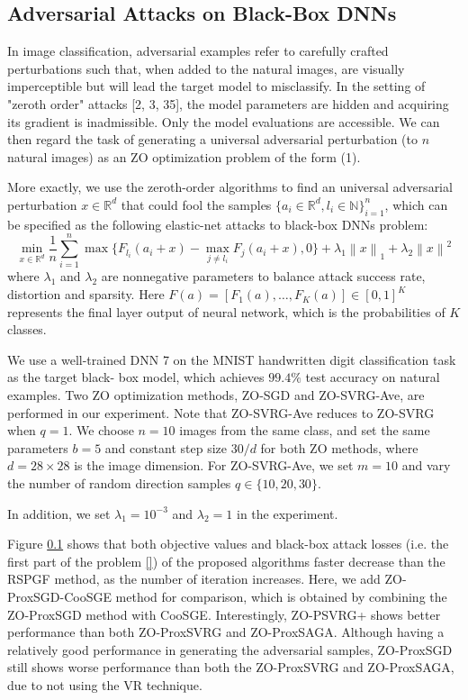 \documentclass{article}
\newcommand*{\R}{\mathbb{R}}
\newcommand{\norm}[1]{\left\lVert#1\right\rVert}
\theoremstyle{definition}
\theoremstyle{remark}
\begin{document}
\subsection{Adversarial Attacks on Black-Box DNNs}

{\color{Brown}
In image classification, adversarial
examples refer to carefully crafted perturbations such that, when added to the natural images, are
visually imperceptible but will lead the target model to misclassify. In the setting of "zeroth order"
attacks [2, 3, 35], the model parameters are hidden and acquiring its gradient is inadmissible. Only
the model evaluations are accessible. We can then regard the task of generating a universal adversarial
perturbation (to $n$ natural images) as an ZO optimization problem of the form (1).
{\color{Green}
More exactly,
we use the zeroth-order algorithms to find an universal adversarial perturbation $x\in\R^d$ that could fool the samples $\{a_i \in \R^d, l_i\in\mathbb{N} \}_{i=1}^n$, which can be specified as the following elastic-net attacks to black-box DNNs problem:
\begin{equation}
\min_{x\in\R^d} \frac{1}{n} \sum_{i=1}^n \max\{F_{l_i}(a_i+x) - \max_{j\neq l_i}F_j(a_i+x),0\} + \lambda_1 \norm{x}_{1} + \lambda_2 \norm{x}^{2}
\end{equation}
where $\lambda_1$ and $\lambda_2$ are nonnegative parameters to balance attack success rate, distortion and sparsity. Here $F(a) = \left[F_1(a),\ldots,F_K(a)\right]\in [0, 1]^K$ represents the final layer output of neural network, which is the probabilities of $K$ classes.

}

We use a well-trained DNN 7 on the MNIST handwritten digit classification task as the target black-
box model, which achieves $99.4\%$ test accuracy on natural examples. Two ZO optimization methods,
ZO-SGD and ZO-SVRG-Ave, are performed in our experiment. Note that ZO-SVRG-Ave reduces
to ZO-SVRG when $q = 1$. We choose $n = 10$ images from the same class, and set the same
parameters $b = 5$ and constant step size $30/d$ for both ZO methods, where $d = 28 \times 28$ is the image
dimension. For ZO-SVRG-Ave, we set $m = 10$ and vary the number of random direction samples
$q \in \{10, 20, 30\}$.


{\color{Green}
In addition, we set $\lambda_1 = 10^{-3}$ and $\lambda_2 = 1$ in the experiment.
}
}


{\color{Green}

Figure \ref{} shows that both objective values and black-box attack losses (i.e. the first part of the problem \eqref{}) of the proposed algorithms faster decrease than the RSPGF method, as the number of iteration increases. Here, we add ZO-ProxSGD-CooSGE method for comparison, which is obtained by combining the ZO-ProxSGD method with 
CooSGE. Interestingly, ZO-PSVRG+ shows better performance than both ZO-ProxSVRG and ZO-ProxSAGA. Although having a relatively good performance in generating the adversarial samples, ZO-ProxSGD still shows worse performance than both the ZO-ProxSVRG and ZO-ProxSAGA, due to not using the VR technique.}
\end{document}
